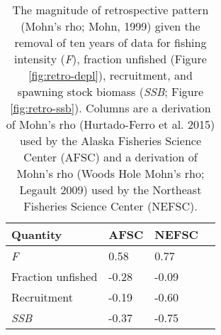 
\begin{longtable}[t]{llll}
\caption{\label{tab:RetroMohnsrho}The magnitude of retrospective pattern (Mohn's rho; Mohn, 1999) given the removal of ten years of data for fishing intensity (\emph{F}), fraction unfished (Figure \ref{fig:retro-depl}),  recruitment, and spawning stock biomass (\emph{SSB}; Figure \ref{fig:retro-ssb}). Columns are a derivation of Mohn's rho (Hurtado-Ferro et al. 2015) used by the Alaska Fisheries Science Center (AFSC) and a derivation of Mohn's rho (Woods Hole Mohn's rho; Legault 2009) used by the Northeast Fisheries Science Center (NEFSC).}\\
\toprule
Quantity & AFSC & NEFSC\\
\midrule
\emph{F} & 0.58 & 0.77\\
Fraction unfished & -0.28 & -0.09\\
Recruitment & -0.19 & -0.60\\
\emph{SSB} & -0.37 & -0.75\\
\bottomrule
\end{longtable}
